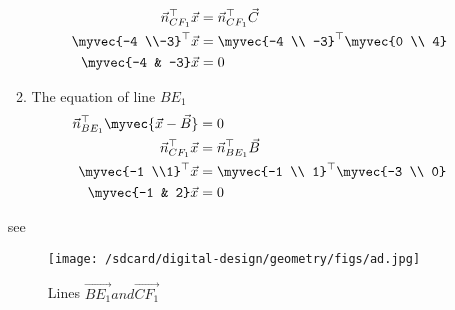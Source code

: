 \documentclass[11pt]{book}
\begin{document}
\begin{enumerate}[label=\thesection.\arabic*.,ref=\thesection.\theenumi]
\begin{enumerate}
\begin{align}
          \vec{n}^{\top}_{CF_1}\vec{x}&= \vec{n}^{\top}_{CF_1}\vec{C} \\
          \myvec{-4 \\-3}^{\top}\vec{x}&=\myvec{-4 \\ -3}^{\top}\myvec{0 \\ 4}\\
          \myvec{-4 & -3}\vec{x}&=0
      \end{align}
      \item The equation of line $BE_1$
      \begin{align}
          \vec{n}^{\top}_{BE_1}\myvec{\vec{x}-\vec{B}}&=0 \\
          \vec{n}^{\top}_{CF_1}\vec{x}&= \vec{n}^{\top}_{BE_1}\vec{B} \\
          \myvec{-1 \\1}^{\top}\vec{x}&=\myvec{-1 \\ 1}^{\top}\myvec{-3 \\ 0}\\
          \myvec{-1 & 2}\vec{x}&=0
      \end{align}
  \end{enumerate}
  see 
  \begin{figure}[H]
      \centering
      \texttt{[image: /sdcard/digital-design/geometry/figs/ad.jpg]}
      \caption{Lines $\vec{BE_1} and \vec{CF_1}$}
      \label{fig:line_BE1_CF1}
  \end{figure}
  


\end{enumerate}
\end{document}
